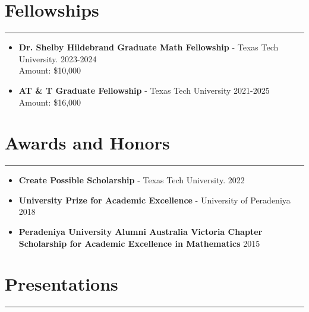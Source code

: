 \documentclass[12pt]{book}
\begin{document}
\section*{Fellowships}
\rule{\textwidth}{1pt}
\begin{itemize}
	\item \textbf{Dr. Shelby Hildebrand Graduate Math Fellowship}  - Texas Tech University.   \hfill 2023-2024\\
	Amount: \$10,000
	\item \textbf{AT \& T Graduate Fellowship} - Texas Tech University \hfill 2021-2025\\
	Amount: \$16,000
\end{itemize}


























\section*{Awards and Honors}
\rule{\textwidth}{1pt}

\begin{itemize}
	\item \textbf{Create Possible Scholarship} - Texas Tech University. \hfill 2022
	\item \textbf{University Prize for Academic Excellence} - University of Peradeniya \hfill 2018
	\item \textbf{Peradeniya University Alumni Australia Victoria Chapter Scholarship for Academic Excellence in Mathematics} \hfill 2015
\end{itemize}



\section*{Presentations}
\rule{\textwidth}{1pt}\\
\end{document}

